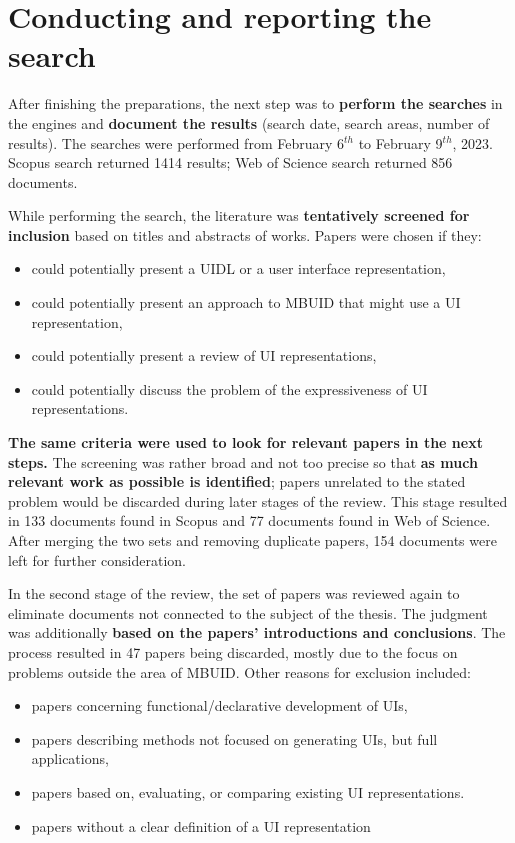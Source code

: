 \section{Conducting and reporting the search}\label{sec:conducting-and-reporting-the-search}


After finishing the preparations, the next step was to \textbf{perform the searches} in the engines and \textbf{document the results} (search date, search areas, number of results).
The searches were performed from February 6$^{th}$ to February 9$^{th}$, 2023.
Scopus search returned 1414 results;
Web of Science search returned 856 documents.

While performing the search, the literature was \textbf{tentatively screened for inclusion} based on titles and abstracts of works.
Papers were chosen if they:
\begin{itemize}
    \item could potentially present a UIDL or a user interface representation,
    \item could potentially present an approach to MBUID that might use a UI representation,
    \item could potentially present a review of UI representations,
    \item could potentially discuss the problem of the expressiveness of UI representations.
\end{itemize}
\textbf{The same criteria were used to look for relevant papers in the next steps.}
The screening was rather broad and not too precise so that \textbf{as much relevant work as possible is identified};
papers unrelated to the stated problem would be discarded during later stages of the review.
This stage resulted in 133 documents found in Scopus and 77 documents found in Web of Science.
After merging the two sets and removing duplicate papers, 154 documents were left for further consideration.

In the second stage of the review, the set of papers was reviewed again to eliminate documents not connected to the subject of the thesis.
The judgment was additionally \textbf{based on the papers' introductions and conclusions}.
The process resulted in 47 papers being discarded, mostly due to the focus on problems outside the area of MBUID\@.
Other reasons for exclusion included:
\begin{itemize}
    \item papers concerning functional/declarative development of UIs,
    \item papers describing methods not focused on generating UIs, but full applications,
    \item papers based on, evaluating, or comparing existing UI representations.
    \item papers without a clear definition of a UI representation
\end{itemize}

